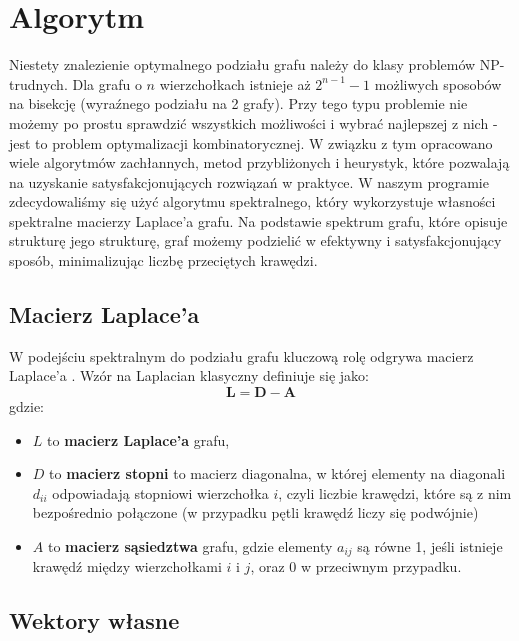 \documentclass{article}
\begin{document}
\section{Algorytm}

Niestety znalezienie optymalnego podziału grafu należy do klasy problemów NP-trudnych. Dla grafu o \( n \) wierzchołkach istnieje aż \( 2^{n-1} - 1 \) możliwych sposobów na bisekcję (wyraźnego podziału na 2 grafy). \cite{youtube_video} Przy tego typu problemie nie możemy po prostu sprawdzić wszystkich możliwości i wybrać najlepszej z nich - jest to problem optymalizacji kombinatorycznej. W związku z tym opracowano wiele algorytmów zachłannych, metod przybliżonych i heurystyk, które pozwalają na uzyskanie satysfakcjonujących rozwiązań w praktyce.
W naszym programie zdecydowaliśmy się użyć algorytmu spektralnego, który wykorzystuje własności spektralne macierzy Laplace'a grafu. Na podstawie spektrum grafu, które opisuje strukturę jego strukturę, graf możemy podzielić w efektywny i satysfakcjonujący sposób, minimalizując liczbę przeciętych krawędzi.



    \subsection{Macierz Laplace'a}
    
    W podejściu spektralnym do podziału grafu kluczową rolę odgrywa macierz Laplace'a \cite{laplacian_matrix}.
    Wzór na Laplacian klasyczny definiuje się jako:
    \[
    \mathbf{L} = \mathbf{D} - \mathbf{A}
    \]
    gdzie:
    \begin{itemize}
      \item \( L \) to \textbf{macierz Laplace'a} grafu,
      \item \( D \) to \textbf{macierz stopni} to macierz diagonalna, w której elementy na diagonali \( d_{ii} \) odpowiadają stopniowi wierzchołka \( i \), czyli liczbie krawędzi, które są z nim bezpośrednio połączone (w przypadku pętli krawędź liczy się podwójnie)
      \item \( A \) to \textbf{macierz sąsiedztwa} grafu, gdzie elementy \( a_{ij} \) są równe 1, jeśli istnieje krawędź między wierzchołkami \( i \) i \( j \), oraz 0 w przeciwnym przypadku.
    \end{itemize}
    


    \subsection{Wektory własne}
\end{document}
